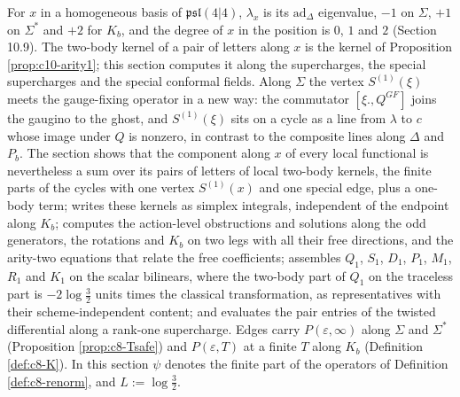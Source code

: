 For $x$ in a homogeneous basis of $\mathfrak{psl}(4|4)$, $\lambda_x$ is its $\mathrm{ad}_\Delta$ eigenvalue, $-1$ on $\Sigma$, $+1$ on $\Sigma^*$ and $+2$ for $K_b$, and the degree of $x$ in the position is $0$, $1$ and $2$ (Section 10.9). The two-body kernel of a pair of letters along $x$ is the kernel of Proposition \ref{prop:c10-arity1}; this section computes it along the supercharges, the special supercharges and the special conformal fields. Along $\Sigma$ the vertex $S^{(1)}(\xi)$ meets the gauge-fixing operator in a new way: the commutator $[\xi.,Q^{GF}]$ joins the gaugino to the ghost, and $S^{(1)}(\xi)$ sits on a cycle as a line from $\lambda$ to $c$ whose image under $Q$ is nonzero, in contrast to the composite lines along $\Delta$ and $P_b$. The section shows that the component along $x$ of every local functional is nevertheless a sum over its pairs of letters of local two-body kernels, the finite parts of the cycles with one vertex $S^{(1)}(x)$ and one special edge, plus a one-body term; writes these kernels as simplex integrals, independent of the endpoint along $K_b$; computes the action-level obstructions and solutions along the odd generators, the rotations and $K_b$ on two legs with all their free directions, and the arity-two equations that relate the free coefficients; assembles $Q_1$, $S_1$, $D_1$, $P_1$, $M_1$, $R_1$ and $K_1$ on the scalar bilinears, where the two-body part of $Q_1$ on the traceless part is $-2\log\tfrac32$ units times the classical transformation, as representatives with their scheme-independent content; and evaluates the pair entries of the twisted differential along a rank-one supercharge. Edges carry $P(\varepsilon,\infty)$ along $\Sigma$ and $\Sigma^*$ (Proposition \ref{prop:c8-Tsafe}) and $P(\varepsilon,T)$ at a finite $T$ along $K_b$ (Definition \ref{def:c8-K}). In this section $\psi$ denotes the finite part of the operators of Definition \ref{def:c8-renorm}, and $L:=\log\tfrac32$.

